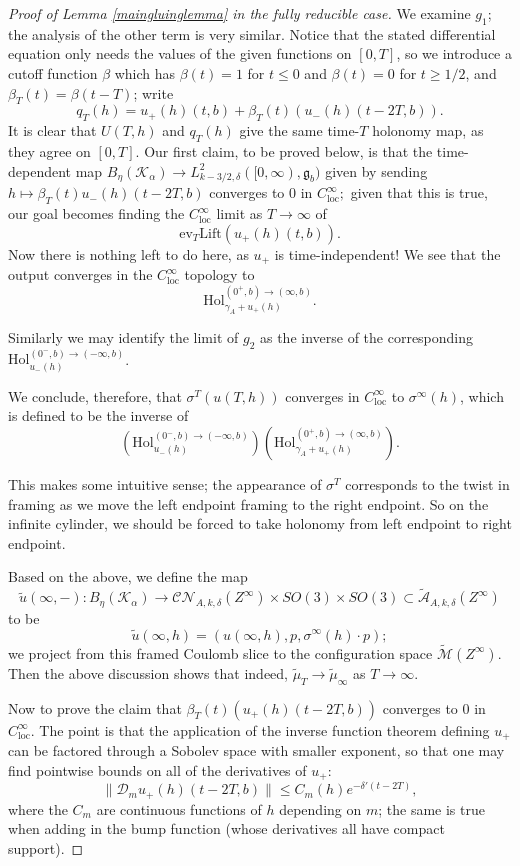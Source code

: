 \documentclass[10pt,a4paper]{amsart}
\theoremstyle{definition}
\theoremstyle{remark}
\numberwithin{figure}{qchap}
\begin{document}
\begin{proof}[Proof of Lemma \ref{maingluinglemma} in the fully reducible case]
We examine $g_1$; the analysis of the other term is very similar. Notice that the stated differential equation only needs the values of the given functions on $[0,T]$, so we introduce a cutoff function $\beta$ which has $\beta(t) = 1$ for $t \leq 0$ and $\beta(t) = 0$ for $t \geq 1/2$, and $\beta_T(t) = \beta(t-T)$; write $$q_T(h) = u_+(h)(t,b) + \beta_T(t)\left(u_-(h)(t - 2T, b)\right).$$ It is clear that $U(T,h)$ and $q_T(h)$ give the same time-$T$ holonomy map, as they agree on $[0,T]$. Our first claim, to be proved below, is that the time-dependent map $B_\eta(\mathcal K_\alpha) \to L^2_{k-3/2, \delta}([0,\infty), \mathfrak g_b)$ given by sending $h \mapsto \beta_T(t) u_-(h)(t-2T, b)$ converges to $0$ in $C^\infty_{\text{loc}};$ given that this is true, our goal becomes finding the $C^\infty_{\text{loc}}$ limit as $T \to \infty$ of $$\text{ev}_{T}\text{Lift}\left(u_+(h)(t,b)\right).$$ Now there is nothing left to do here, as $u_+$ is time-independent! We see that the output converges in the $C^\infty_{\text{loc}}$ topology to $$\text{Hol}^{(0^+, b) \to (\infty, b)}_{\gamma_A + u_+(h)}.$$

Similarly we may identify the limit of $g_2$ as the inverse of the corresponding $\text{Hol}^{(0^-,b) \to (-\infty,b)}_{u_-(h)}$.

We conclude, therefore, that $\sigma^T(u(T,h))$ converges in $C^\infty_{\text{loc}}$ to $\sigma^\infty(h)$, which is defined to be the inverse of $$\left(\text{Hol}^{(0^-,b) \to (-\infty,b)}_{u_-(h)}\right) \left(\text{Hol}^{(0^+, b) \to (\infty, b)}_{\gamma_A + u_+(h)}\right).$$

This makes some intuitive sense; the appearance of $\sigma^T$ corresponds to the twist in framing as we move the left endpoint framing to the right endpoint. So on the infinite cylinder, we should be forced to take holonomy from left endpoint to right endpoint.

Based on the above, we define the map $$\widetilde u(\infty, -): B_\eta(\mathcal K_\alpha) \to \mathcal{CN}_{A,k,\delta}(Z^\infty) \times SO(3) \times SO(3) \subset \widetilde{\mathcal A}_{A,k,\delta}(Z^\infty)$$ to be $$\widetilde u(\infty, h) = (u(\infty, h), p, \sigma^\infty(h) \cdot p);$$ we project from this framed Coulomb slice to the configuration space $\widetilde{\mathcal M}(Z^\infty)$. Then the above discussion shows that indeed, $\widetilde{\mu}_T \to \widetilde{\mu}_\infty$ as $T \to \infty$.

Now to prove the claim that $\beta_T(t)\left(u_+(h)(t-2T, b)\right)$ converges to $0$ in $C^\infty_{\text{loc}}$. The point is that the application of the inverse function theorem defining $u_+$ can be factored through a Sobolev space with smaller exponent, so that one may find pointwise bounds on all of the derivatives of $u_+$: $$\|\mathcal D_m u_+(h)(t-2T, b)\| \leq C_m(h) e^{-\delta'(t-2T)},$$ where the $C_m$ are continuous functions of $h$ depending on $m$; the same is true when adding in the bump function (whose derivatives all have compact support).


\end{proof}
\end{document}
